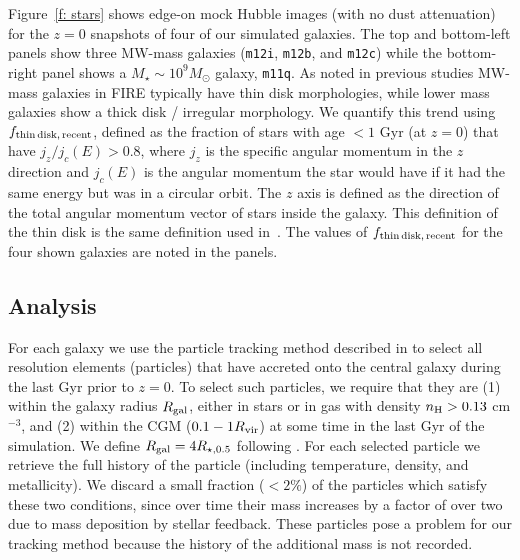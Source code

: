 \documentclass[fleqn,usenatbib]{mnras}
\begin{document}
Figure~\ref{f: stars} shows edge-on mock Hubble images (with no dust attenuation) for the $z=0$ snapshots of four of our simulated galaxies. The top and bottom-left panels show three MW-mass galaxies (\texttt{m12i}, \texttt{m12b}, and \texttt{m12c}) while the bottom-right panel shows a $M_\star \sim 10^9 M_\odot$ galaxy, \texttt{m11q}.
As noted in previous studies \cite{?} MW-mass galaxies in FIRE typically have thin disk morphologies, while lower mass galaxies show a thick disk / irregular morphology. We quantify this trend using $f_{\rm thin\,disk,\,recent}$, defined as the fraction of stars with age $<1$ Gyr (at $z=0$) that have $j_z/j_c(E) > 0.8$, where $j_z$ is the specific angular momentum in the $z$ direction  and $j_c(E)$ is the angular momentum the star would have if it had the same energy but was in a circular orbit. The $z$ axis is defined as the direction of the total angular momentum vector of stars inside the galaxy.  This definition of the thin disk is the same definition used in~\cite{Yu2021}. The values of $f_{\rm thin\,disk,\,recent}$ for the four shown galaxies are noted in the panels. 


\subsection{Analysis}
\label{s: methods -- analysis}

For each galaxy we use the particle tracking method described in \cite{Hafen2019, Hafen2020} to select all resolution elements (particles) that have accreted onto the central galaxy during the last Gyr prior to $z=0$. To select such particles, we require that they are (1) within the galaxy radius $R_{\rm gal}$, either in stars or in gas with density  $n_{\rm H} > 0.13$ cm$^{-3}$, and (2) within the CGM ($0.1 -1 R_{\rm vir}$) at some time in the last Gyr of the simulation. 
We define $R_{\rm gal} = 4 R_{\star,0.5}$ following \cite{Hafen2019, Hafen2020}.
For each selected particle we retrieve the full history of the particle (including temperature, density, and metallicity). 
We discard a small fraction ($<2\%$) of the particles which satisfy these two conditions, since over time their mass increases by a factor of over two due to mass deposition by stellar feedback. These particles pose a problem for our tracking method because the history of the additional mass is not recorded.
\end{document}

